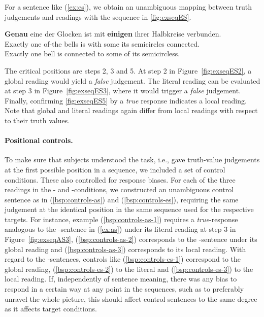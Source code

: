 \documentclass[fleqn,reqno,10pt]{article}
\newcommand{\as}{\acro{as}}
\renewcommand{\es}{\acro{es}}
\renewcommand{\mymark}[1]{\textbf{#1}}
\begin{document}
%
For a sentence like (\ref{ex:es}), we obtain an unambiguous mapping
between truth judgements and readings with the sequence in
\ref{fig:exseqES}.
\begin{exe}
\ex \label{ex:es} \gll \mymark{Genau} eine der Glocken ist mit
  \mymark{einigen} ihrer Halbkreise verbunden.\\ 
  Exactly one of-the bells is with some its semicircles connected.\\
  \trans Exactly one bell is connected to some of its semicircless.
\end{exe}
The critical positions are steps 2, 3 and 5. At step 2 in
Figure~\ref{fig:exseqES2}, a global reading would yield a \emph{false}
judgement. The literal reading can be evaluated at step 3 in
Figure~\ref{fig:exseqES3}, where it would trigger a \emph{false}
judgement. Finally, confirming \ref{fig:exseqES5} by a \emph{true}
response indicates a local reading. Note that global and literal
readings again differ from local readings with respect to their truth
values.


\paragraph{Positional controls.} To make sure that subjects understood
the task, i.e., gave truth-value judgements at the first possible
position in a sequence, we included a set of control conditions. These
also controlled for response biases. For each of the three readings in
the \as- and \es-conditions, we constructed an unambiguous control
sentence as in (\ref{bsp:controls-as}) and (\ref{bsp:controls-es}),
requiring the same judgement at the identical position in the same
sequence used for the respective targets. For instance, example
(\ref{bsp:controls-as-1}) requires a \emph{true}-response analogous to
the \as-sentence in (\ref{ex:as}) under its literal reading at step 3
in Figure~\ref{fig:exseqAS3}, (\ref{bsp:controls-as-2}) corresponds to
the \as-sentence under its global reading and
(\ref{bsp:controls-as-3}) corresponds to its local reading. With
regard to the \es-sentences, controls like (\ref{bsp:controls-es-1})
correspond to the global reading, (\ref{bsp:controls-es-2}) to the
literal and (\ref{bsp:controls-es-3}) to the local reading. If,
independently of sentence meaning, there was any bias to respond in a
certain way at any point in the sequences, such as to preferably
unravel the whole picture, this should affect control sentences to the
same degree as it affects target conditions.
\end{document}

